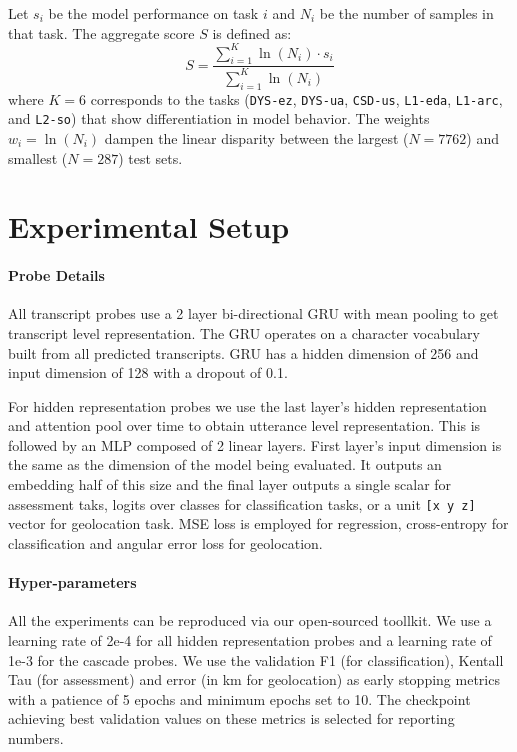 Let $s_i$ be the model performance on task $i$ and $N_i$ be the number of samples in that task. The aggregate score $S$ is defined as:
\begin{equation}
    S = \frac{\sum_{i=1}^{K} \ln(N_i) \cdot s_i}{\sum_{i=1}^{K} \ln(N_i)}
\end{equation}
where $K=6$ corresponds to the tasks (\texttt{DYS-ez}, \texttt{DYS-ua}, \texttt{CSD-us}, \texttt{L1-eda}, \texttt{L1-arc}, and \texttt{L2-so}) that show differentiation in model behavior.
The weights $w_i = \ln(N_i)$ dampen the linear disparity between the largest ($N=7762$) and smallest ($N=287$) test sets.


\section{Experimental Setup}
\label{appendix:setup}

\paragraph{Probe Details}
All transcript probes use a 2 layer bi-directional GRU with mean pooling to get transcript level representation.
The GRU operates on a character vocabulary built from all predicted transcripts.
GRU has a hidden dimension of 256 and input dimension of 128 with a dropout of 0.1.

For hidden representation probes we use the last layer's hidden representation and attention pool over time to obtain utterance level representation.
This is followed by an MLP composed of 2 linear layers.
First layer's input dimension is the same as the dimension of the model being evaluated.
It outputs an embedding half of this size and the final layer outputs a single scalar for assessment taks, logits over classes for classification tasks, or a unit \texttt{[x y z]} vector for geolocation task.
MSE loss is employed for regression, cross-entropy for classification and angular error loss \cite{foley-2024-geolocating} for geolocation.

\paragraph{Hyper-parameters}
All the experiments can be reproduced via our open-sourced toollkit.
We use a learning rate of 2e-4 for all hidden representation probes and a learning rate of 1e-3 for the cascade probes.
We use the validation F1 (for classification), Kentall Tau (for assessment) and error (in km for geolocation) as early stopping metrics with a patience of 5 epochs and minimum epochs set to 10.
The checkpoint achieving best validation values on these metrics is selected for reporting numbers.

